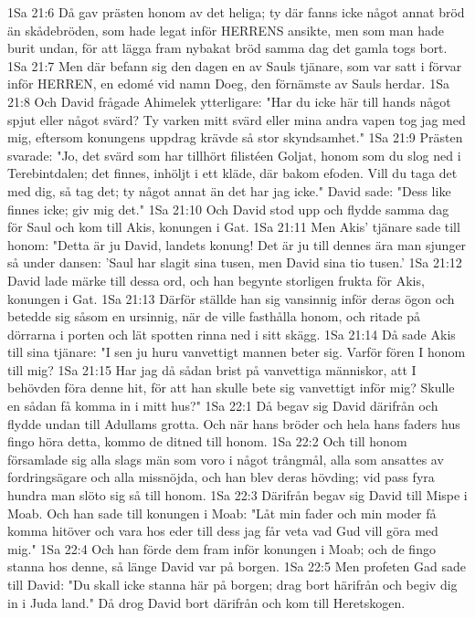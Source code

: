 1Sa 21:6  Då gav prästen honom av det heliga; ty där fanns icke något annat bröd än skådebröden, som hade legat inför HERRENS ansikte, men som man hade burit undan, för att lägga fram nybakat bröd samma dag det gamla togs bort.
1Sa 21:7  Men där befann sig den dagen en av Sauls tjänare, som var satt i förvar inför HERREN, en edomé vid namn Doeg, den förnämste av Sauls herdar.
1Sa 21:8  Och David frågade Ahimelek ytterligare: "Har du icke här till hands något spjut eller något svärd? Ty varken mitt svärd eller mina andra vapen tog jag med mig, eftersom konungens uppdrag krävde så stor skyndsamhet."
1Sa 21:9  Prästen svarade: "Jo, det svärd som har tillhört filistéen Goljat, honom som du slog ned i Terebintdalen; det finnes, inhöljt i ett kläde, där bakom efoden. Vill du taga det med dig, så tag det; ty något annat än det har jag icke." David sade: "Dess like finnes icke; giv mig det."
1Sa 21:10  Och David stod upp och flydde samma dag för Saul och kom till Akis, konungen i Gat.
1Sa 21:11  Men Akis' tjänare sade till honom: "Detta är ju David, landets konung! Det är ju till dennes ära man sjunger så under dansen: 'Saul har slagit sina tusen, men David sina tio tusen.'
1Sa 21:12  David lade märke till dessa ord, och han begynte storligen frukta för Akis, konungen i Gat.
1Sa 21:13  Därför ställde han sig vansinnig inför deras ögon och betedde sig såsom en ursinnig, när de ville fasthålla honom, och ritade på dörrarna i porten och lät spotten rinna ned i sitt skägg.
1Sa 21:14  Då sade Akis till sina tjänare: "I sen ju huru vanvettigt mannen beter sig. Varför fören I honom till mig?
1Sa 21:15  Har jag då sådan brist på vanvettiga människor, att I behövden föra denne hit, för att han skulle bete sig vanvettigt inför mig? Skulle en sådan få komma in i mitt hus?"
1Sa 22:1  Då begav sig David därifrån och flydde undan till Adullams grotta. Och när hans bröder och hela hans faders hus fingo höra detta, kommo de ditned till honom.
1Sa 22:2  Och till honom församlade sig alla slags män som voro i något trångmål, alla som ansattes av fordringsägare och alla missnöjda, och han blev deras hövding; vid pass fyra hundra man slöto sig så till honom.
1Sa 22:3  Därifrån begav sig David till Mispe i Moab. Och han sade till konungen i Moab: "Låt min fader och min moder få komma hitöver och vara hos eder till dess jag får veta vad Gud vill göra med mig."
1Sa 22:4  Och han förde dem fram inför konungen i Moab; och de fingo stanna hos denne, så länge David var på borgen.
1Sa 22:5  Men profeten Gad sade till David: "Du skall icke stanna här på borgen; drag bort härifrån och begiv dig in i Juda land." Då drog David bort därifrån och kom till Heretskogen.

